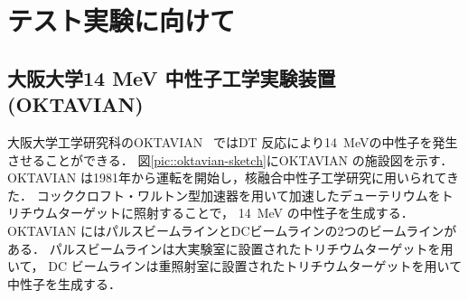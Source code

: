 \documentclass[../master]{subfiles}
\begin{document}
\chapter{テスト実験に向けて}
\label{chap::experiment}
\section{大阪大学14 MeV 中性子工学実験装置 (OKTAVIAN)}
大阪大学工学研究科のOKTAVIAN~\cite{oktavian} ではDT 反応により\SI{14}{\mega\electronvolt}の中性子を発生させることができる．
図\ref{pic::oktavian-sketch}にOKTAVIAN の施設図を示す．
OKTAVIAN は1981年から運転を開始し，核融合中性子工学研究に用いられてきた．
コッククロフト・ワルトン型加速器を用いて加速したデューテリウムをトリチウムターゲットに照射することで，
\SI{14}{\mega\electronvolt} の中性子を生成する．
OKTAVIAN にはパルスビームラインとDCビームラインの2つのビームラインがある．
パルスビームラインは大実験室に設置されたトリチウムターゲットを用いて，
DC ビームラインは重照射室に設置されたトリチウムターゲットを用いて中性子を生成する．
\end{document}
